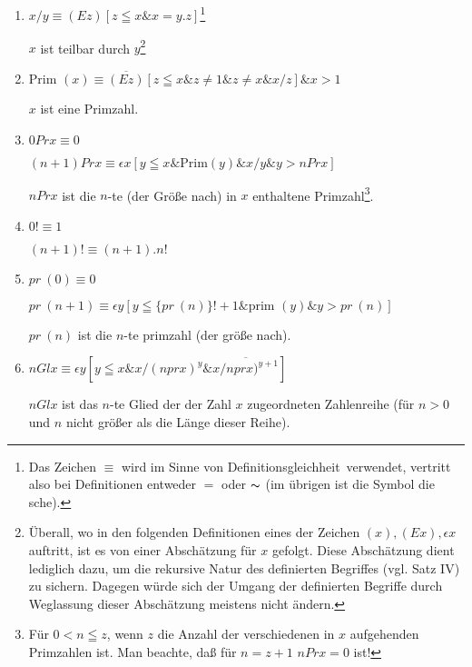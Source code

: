 \documentclass{scrartcl}
\newcommand{\fnvierunddreissiga}{34a}
\begin{document}
\begin{enumerate}[1.]
	\item $x/y \equiv (Ez) [z \leqq x \& x = y.z]$\footnote{Das Zeichen $\equiv$ wird im Sinne von \glqq Definitionsgleichheit\grqq\ verwendet, vertritt also bei Definitionen entweder $=$ oder $\thicksim$ (im übrigen ist
	die Symbol die sche).}

	$x$ ist teilbar durch $y$\footnote{Überall, wo in den folgenden Definitionen eines der Zeichen $(x), (Ex), \epsilon x$ auftritt, ist es von einer Abschätzung für $x$ gefolgt. Diese Abschätzung dient lediglich dazu, um die rekursive Natur des definierten Begriffes (vgl. Satz IV) zu sichern. Dagegen würde sich der Umgang der definierten Begriffe durch Weglassung dieser Abschätzung meistens nicht ändern.}

	\item $\text{Prim }(x) \equiv \overline{(Ez)} [z \leqq x \& z \not = 1 \& z \not = x \& x/z] \& x > 1$

	$x$ ist eine Primzahl.

	\item $0 Pr x \equiv 0$

	$(n + 1) Pr x \equiv \epsilon x [y \leqq x \& \text{Prim}(y) \& x/y \& y > n Pr x]$
	\let\originalfootnote=\thefootnote
	\let\thefootnote=\fnvierunddreissiga

	$n Prx$ ist die $n$-te (der Größe nach) in $x$ enthaltene Primzahl\footnote{Für $0 < n \leqq z$, wenn $z$ die Anzahl der verschiedenen in $x$ aufgehenden Primzahlen ist. Man beachte, daß für $n = z + 1$ \hspace{0.5cm} $n Pr x = 0$ ist!}.
	\let\thefootnote=\originalfootnote
	\setcounter{footnote}{35}

	\item $0! \equiv 1$

	$(n + 1)! \equiv (n + 1).n!$

	\item $pr\ (0) \equiv 0$

	$pr\ (n + 1) \equiv \epsilon y [y \leqq \{ pr\ (n) \}! + 1 \& \text{prim }(y) \& y > pr\ (n)] $

	$pr\ (n)$ ist die $n$-te primzahl (der größe nach).

	\item $n Gl x \equiv \epsilon y [y \leqq x \& x/(n pr x)^y \& \overline{x/n pr x)^{y + 1}}]$

	$n Gl x$ ist das $n$-te Glied der der Zahl $x$
	zugeordneten Zahlenreihe (für $n > 0$ und $n$ nicht
	größer als die Länge dieser Reihe).


\end{enumerate}
\end{document}
